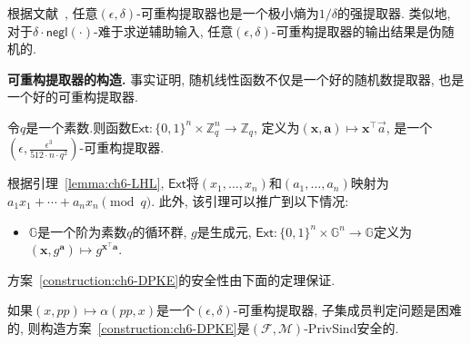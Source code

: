 根据文献~\cite{Trevisan-ACM-2001}, 任意$(\epsilon, \delta)$-可重构提取器也是一个极小熵为$1/\delta$的强提取器. 类似地, 对于$\delta \cdot \mathsf{negl}(\cdot)$-难于求逆辅助输入, 任意$(\epsilon, \delta)$-可重构提取器的输出结果是伪随机的.

\begin{trivlist}
\item \textbf{可重构提取器的构造.} 事实证明, 随机线性函数不仅是一个好的随机数提取器, 也是一个好的可重构提取器.
\end{trivlist}
\begin{lemma}\label{lemma:ch6-LHL}
令$q$是一个素数.则函数$\mathsf{Ext}: \{0, 1\}^n \times \mathbb{Z}_q^n \rightarrow \mathbb{Z}_q$, 定义为$(\mathbf{x}, \mathbf{a}) \mapsto \mathbf{x}^{\top}\vec{a}$, 是一个$(\epsilon, \frac{\epsilon^3}{512 \cdot n \cdot q^2})$-可重构提取器.
\end{lemma}

根据引理~\ref{lemma:ch6-LHL}, $\mathsf{Ext}$将$(x_1, \ldots, x_n)$和$(a_1, \ldots, a_n)$映射为$a_1x_1 + \cdots + a_nx_n \pmod q$. 此外, 该引理可以推广到以下情况:
\begin{itemize}
\item $\mathbb{G}$是一个阶为素数$q$的循环群, $g$是生成元, $\mathsf{Ext}: \{0, 1\}^n \times \mathbb{G}^n \rightarrow \mathbb{G}$定义为$(\mathbf{x}, g^{\mathbf{a}})  \mapsto g^{\mathbf{x}^{\top}\mathbf{a}}$.
\end{itemize}

方案~\ref{construction:ch6-DPKE}的安全性由下面的定理保证.
\begin{theorem}
如果$(x, pp) \mapsto \alpha(pp, x)$是一个$(\epsilon, \delta)$-可重构提取器, 子集成员判定问题是困难的, 则构造方案~\ref{construction:ch6-DPKE}是$(\mathcal{F}, \mathcal{M})$-PrivSind安全的.
\end{theorem}

